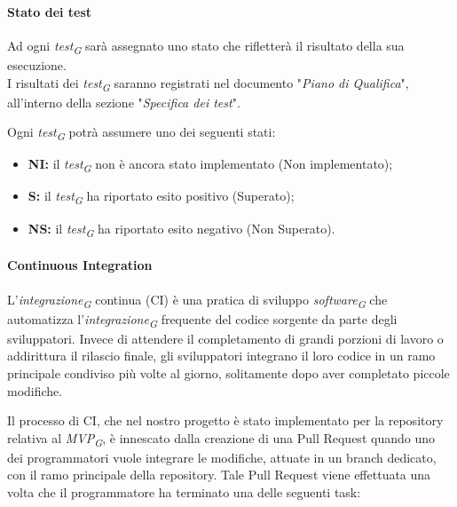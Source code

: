 \paragraph{Stato dei test}
Ad ogni \textit{test}\textsubscript{\textit{G}} sarà assegnato uno stato che rifletterà il risultato della sua esecuzione. \\
I risultati dei \textit{test}\textsubscript{\textit{G}} saranno registrati nel documento "\textit{Piano di Qualifica}", all'interno della sezione "\textit{Specifica dei test}".

\vspace{0.2cm}

Ogni \textit{test}\textsubscript{\textit{G}} potrà assumere uno dei seguenti stati:

\begin{itemize}
    \item \textbf{NI:} 
        il \textit{test}\textsubscript{\textit{G}} non è ancora stato implementato (Non implementato); 
    \item \textbf{S:} 
        il \textit{test}\textsubscript{\textit{G}} ha riportato esito positivo (Superato); 
    \item \textbf{NS:}
        il \textit{test}\textsubscript{\textit{G}} ha riportato esito negativo (Non Superato).
\end{itemize}

\paragraph{Continuous Integration}
L'\textit{integrazione}\textsubscript{\textit{G}} continua (CI) è una pratica di sviluppo \textit{software}\textsubscript{\textit{G}} che automatizza l'\textit{integrazione}\textsubscript{\textit{G}} frequente del codice sorgente da parte degli sviluppatori. Invece di attendere il completamento di grandi porzioni di lavoro o addirittura il rilascio finale, gli sviluppatori integrano il loro codice in un ramo principale condiviso più volte al giorno, solitamente dopo aver completato piccole modifiche.

\vspace{0.2cm}

Il processo di CI, che nel nostro progetto è stato implementato per la repository relativa al \textit{MVP}\textsubscript{\textit{G}}, è innescato dalla creazione di una Pull Request quando uno dei programmatori vuole integrare le modifiche, attuate in un branch dedicato, con il ramo principale della repository. Tale Pull Request viene effettuata una volta che il programmatore ha terminato una delle seguenti task:

